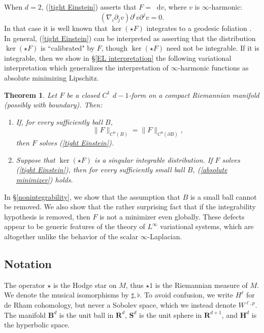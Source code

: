 \documentclass[reqno,11pt]{amsart}
\newcommand{\RR}{\mathbf{R}}
\newcommand{\Hyp}{\mathbf H}
\newcommand{\Sph}{\mathbf S}
\newcommand{\Ball}{\mathbf{B}}
\newcommand*\dif{\mathop{}\!\mathrm{d}}
\newtheorem{mainthm}{Theorem}
\theoremstyle{definition}
\numberwithin{equation}{section}
\begin{document}
When $d = 2$, (\ref{tight Einstein}) asserts that $F = \dif v$, where $v$ is $\infty$-harmonic:
$$(\nabla_i \partial_j v) \partial^i v \partial^j v = 0.$$
In that case it is well known that $\ker(\star F)$ integrates to a geodesic foliation \cite[Proof of Theorem 1.5]{Sheffield12}.
In general, (\ref{tight Einstein}) can be interpreted as asserting that the distribution $\ker(\star F)$ is ``calibrated" by $F$, though $\ker(\star F)$ need not be integrable.
If it is integrable, then we show in \S\ref{EL interpretation} the following variational interpretation which generalizes the interpretation of $\infty$-harmonic functions as absolute minimizing Lipschitz.

\begin{mainthm}\label{tight are absolute minimizers}
Let $F$ be a closed $C^1$ $d - 1$-form on a compact Riemannian manifold (possibly with boundary). Then:
\begin{enumerate}
\item If, for every sufficiently ball $B$,
\begin{equation}\label{absolute minimizer}
\|F\|_{C^0(B)} = \|F\|_{C^0(\partial B)},
\end{equation}
then $F$ solves (\ref{tight Einstein}).
\item Suppose that $\ker(\star F)$ is a singular integrable distribution. If $F$ solves (\ref{tight Einstein}), then for every sufficiently small ball $B$, (\ref{absolute minimizer}) holds.
\end{enumerate}
\end{mainthm}

In \S\ref{nonintegrability}, we show that the assumption that $B$ is a small ball cannot be removed.
We also show that the rather surprising fact that if the integrability hypothesis is removed, then $F$ is not a minimizer even globally.
These defects appear to be generic features of the theory of $L^\infty$ variational systems, which are altogether unlike the behavior of the scalar $\infty$-Laplacian.

\subsection{Notation}
The operator $\star$ is the Hodge star on $M$, thus $\star 1$ is the Riemannian measure of $M$.
We denote the musical isomorphisms by $\sharp, \flat$.
To avoid confusion, we write $H^\ell$ for de Rham cohomology, but never a Sobolev space, which we instead denote $W^{\ell, p}$.
The manifold $\Ball^d$ is the unit ball in $\RR^d$, $\Sph^d$ is the unit sphere in $\RR^{d + 1}$, and $\Hyp^d$ is the hyperbolic space.
\end{document}
